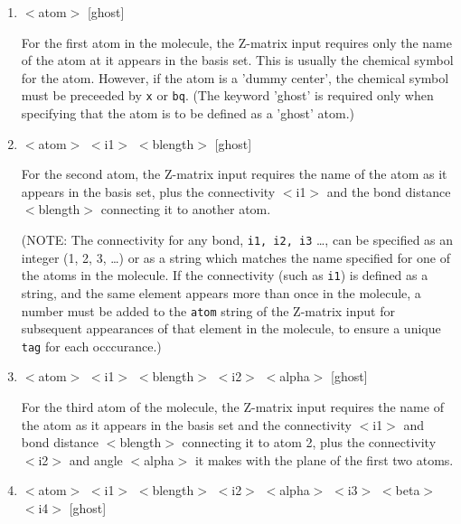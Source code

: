 \begin{enumerate}

   \item $<$atom$>$ [ghost]

    For the first atom in the molecule, the Z-matrix input requires only  
    the name of the atom at it appears in the basis set.  This is usually 
    the chemical symbol for the atom.
    However, if the atom is a 'dummy center', the chemical symbol must
    be preceeded by \verb+x+ or \verb+bq+. (The keyword 'ghost' is required
    only when specifying that the atom is to be defined as a 'ghost' atom.)

   \item $<$atom$>$ $<$i1$>$ $<$blength$>$ [ghost]

    For the second atom, the Z-matrix input requires the name of the atom
    as it appears in the basis set, 
    plus the connectivity $<$i1$>$ and the bond distance $<$blength$>$ 
    connecting it to another atom. 

    (NOTE: The connectivity for any bond, {\tt i1, i2, i3} \ldots, 
    can be specified as an integer (1, 2, 3, \ldots) or as a string 
    which matches the name specified for one of the atoms in the molecule.
    If the connectivity (such as {\tt i1}) is defined as a string,
    and the same element appears more than once in the molecule, a number
    must be added to the {\tt atom} string of the Z-matrix input for
    subsequent appearances of that element in the molecule, to ensure 
    a unique \verb+tag+ for each occcurance.)

   \item $<$atom$>$ $<$i1$>$ $<$blength$>$ $<$i2$>$ $<$alpha$>$ [ghost]

    For the third atom of the molecule, the Z-matrix input requires the
    name of the atom as it appears in the basis set and the connectivity 
    $<$i1$>$ and bond distance 
    $<$blength$>$ connecting it to atom 2, plus the connectivity $<$i2$>$
    and angle $<$alpha$>$ it makes with the plane of the first two atoms. 

   \item $<$atom$>$ $<$i1$>$ $<$blength$>$ $<$i2$>$ $<$alpha$>$ $<$i3$>$ $<$beta$>$ $<$i4$>$ [ghost] %


\end{enumerate}
